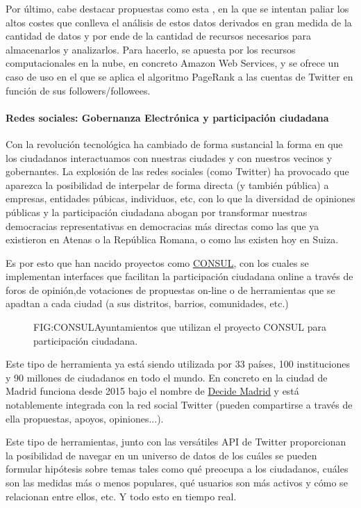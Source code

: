Por último, cabe destacar propuestas como esta \cite{Noordhuis2010}, en la que se intentan paliar los altos costes que conlleva el análisis de estos datos derivados en gran medida de la cantidad de datos y por ende de la cantidad de recursos necesarios para almacenarlos y analizarlos. Para hacerlo, se apuesta por los recursos computacionales en la nube, en concreto Amazon Web Services, y se ofrece un caso de uso en el que se aplica el algoritmo PageRank a las cuentas de Twitter en función de sus followers/followees.

\paragraph{Redes sociales: Gobernanza Electrónica y participación ciudadana}
Con la revolución tecnológica ha cambiado de forma sustancial la forma en que los ciudadanos interactuamos con nuestras ciudades y con nuestros vecinos y gobernantes. La explosión de las redes sociales (como Twitter) ha provocado que aparezca la posibilidad de interpelar de forma directa (y también pública) a empresas, entidades púbicas, individuos, etc, con lo que la diversidad de opiniones públicas y la participación ciudadana abogan por transformar nuestras democracias representativas en democracias más directas como las que ya existieron en Atenas o la República Romana, o como las existen hoy en Suiza.

Es por esto que han nacido proyectos como \href{http://consulproject.org/en/}{CONSUL}, con los cuales se implementan interfaces que facilitan la participación ciudadana online a través de foros de opinión,de votaciones de propuestas on-line o de herramientas que se apadtan a cada ciudad (a sus distritos, barrios, comunidades, etc.) 

\begin{figure}[CONSUL en España y el mundo]{FIG:CONSUL}{Ayuntamientos que utilizan el proyecto CONSUL para participación ciudadana.}
	 \quad
\end{figure}

Este tipo de herramienta ya está siendo utilizada por 33 países, 100 instituciones y 90 millones de ciudadanos en todo el mundo. En concreto en la ciudad de Madrid funciona desde 2015 bajo el nombre de \href{https://decide.madrid.es/}{Decide Madrid} y está notablemente integrada con la red social Twitter (pueden compartirse  a través de ella propuestas, apoyos, opiniones...).

Este tipo de herramientas, junto con las versátiles API de Twitter proporcionan la posibilidad de navegar en un universo de datos de los cuáles se pueden formular hipótesis sobre temas tales como qué preocupa a los ciudadanos, cuáles son las medidas más o menos populares, qué usuarios son más activos y cómo se relacionan entre ellos, etc. Y todo esto en tiempo real.

